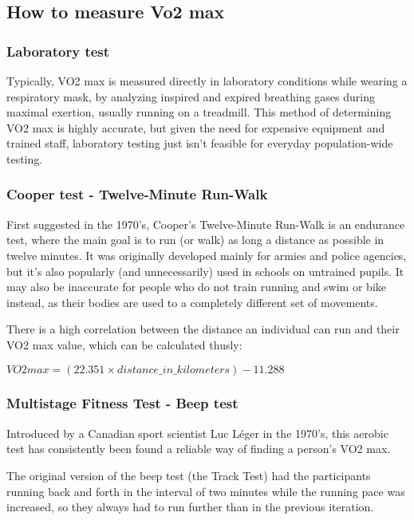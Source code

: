 \subsection{How to measure Vo2 max}

\subsubsection*{Laboratory test}

Typically, VO2 max is measured directly in laboratory conditions while wearing a respiratory mask, by analyzing inspired and expired breathing gases during maximal exertion\cite{vo2max-definition}, usually running on a treadmill.
This method of determining VO2 max is highly accurate, but given the need for expensive equipment and trained staff, laboratory testing just isn't feasible for everyday population-wide testing.

\subsubsection*{Cooper test - Twelve-Minute Run-Walk}

First suggested in the 1970's, Cooper's Twelve-Minute Run-Walk is an endurance test, where the main goal is to run (or walk) as long a distance as possible in twelve minutes.
It was originally developed mainly for armies and police agencies, but it's also popularly (and unnecessarily\cite{cooper-pupils}) used in schools on untrained pupils.
It may also be inaccurate for people who do not train running and swim or bike instead, as their bodies are used to a completely different set of movements.

There is a high correlation between the distance an individual can run and their VO2 max value, which can be calculated thusly:

$VO2max = (22.351 \times distance\_in\_kilometers) - 11.288$\cite{cooper-vo2max}

\subsubsection*{Multistage Fitness Test - Beep test}

Introduced by a Canadian sport scientist Luc Léger in the 1970's, this aerobic test has consistently been found a reliable way of finding a person's VO2 max.

The original version of the beep test (the Track Test) had the participants running back and forth in the interval of two minutes while the running pace was increased, so they always had to run further than in the previous iteration.

